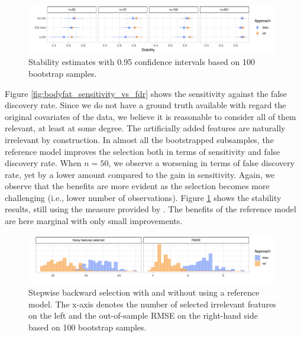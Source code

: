 \documentclass[american,]{article}
\theoremstyle{definition}
\begin{document}
\begin{figure}[tp]
  \centering
  \includegraphics[width=0.98\textwidth]{graphics/bodyfat_stability.pdf}
  \caption{Stability estimates with 0.95 confidence intervals based on 100 bootstrap samples.\\}
  \label{fig:bodyfat_stability}
\end{figure}

Figure \ref{fig:bodyfat_sensitivity_vs_fdr} shows the sensitivity
against the false discovery rate. Since we do not have a ground truth
available with regard the original covariates of the data, we believe
it is reasonable to consider all of them relevant, at least at some
degree. The artificially added features are naturally irrelevant by
construction. In almost all the bootstrapped subsamples, the reference
model improves the selection both in terms of sensitivity and false
discovery rate. When $n=50$, we observe a worsening in terms of false
discovery rate, yet by a lower amount compared to the gain in
sensitivity. Again, we observe that the benefits are more evident as
the selection becomes more challenging (i.e., lower number of
observations). Figure \ref{fig:bodyfat_stability} shows the stability
results, still using the measure provided by
\cite{paper:stability}. The benefits of the reference model are here
marginal with only small improvements.

\begin{figure}[tp]
  \centering
  \includegraphics[width=0.98\textwidth]{graphics/bodyfat_step_refvsdata.pdf}
  \caption{Stepwise backward selection with and without using a reference model. The x-axis denotes the number of selected irrelevant features on the left and the out-of-sample RMSE on the right-hand side based on 100 bootstrap samples.\\}
  \label{fig:bodyfat_step_refvsdata}
\end{figure}
\end{document}
